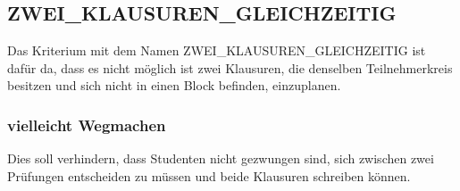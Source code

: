 \subsection{ZWEI\_KLAUSUREN\_GLEICHZEITIG}
Das Kriterium mit dem Namen ZWEI\_KLAUSUREN\_GLEICHZEITIG ist dafür da, dass es nicht
möglich ist zwei Klausuren, die denselben Teilnehmerkreis besitzen und sich nicht in einen
Block befinden, einzuplanen.

\subsubsection{vielleicht Wegmachen}Dies soll verhindern, dass Studenten nicht gezwungen sind,
sich zwischen zwei Prüfungen entscheiden zu müssen und beide Klausuren schreiben können.